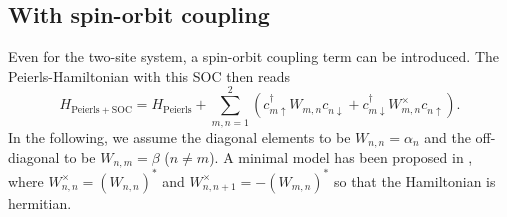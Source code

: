 \documentclass{article}
\newcommand{\pdagger}{{\phantom{\dagger}}}
\begin{document}
\subsection{With spin-orbit coupling}
Even for the two-site system, a spin-orbit coupling term can be introduced. The Peierls-Hamiltonian with this SOC then reads
\begin{equation}
	H_\mathrm{Peierls+SOC} = H_\mathrm{Peierls} + \sum_{m,n=1}^2( c_{m\uparrow}^\dagger W_{m,n}^\pdagger c_{n\downarrow}^\pdagger + c_{m\downarrow}^\dagger W^\times_{m,n} c_{n\uparrow}^\pdagger).
\end{equation}
In the following, we assume the diagonal elements to be $W_{n,n}=\alpha_n$ and the off-diagonal to be $W_{n,m} = \beta$ ($n\neq m$). 
A minimal model has been proposed in \cite{Gutierrez_Díaz_Naaman_Cuniberti_2012}, where $W^\times_{n,n} = (W_{n,n})^*$ and $W_{n,n+1}^\times = -(W_{m,n})^*$ so that the Hamiltonian is hermitian. 
\end{document}

